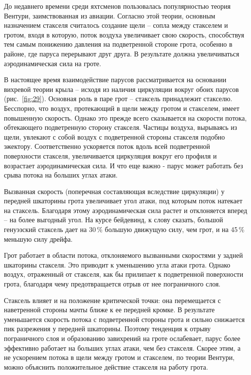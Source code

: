 \documentclass[a4paper, 12pt, twoside, final, book, russian, fittopage, cyremdash]{ncc}
\newcommand{\ris}[1]{\ref{fig:#1}}
\begin{document}
До недавнего времени среди яхтсменов пользовалась популярностью теория Вентури, заимствованная из авиации. Согласно этой теории, основным назначением стакселя считалось создание щели \--- сопла между стакселем и гротом, входя в которую, поток воздуха увеличивает свою скорость, способствуя тем самым понижению давления на подветренной стороне грота, особенно в районе, где паруса перерывают друг друга. В результате должна увеличиваться аэродинамическая сила на гроте.

В настоящее время взаимодействие парусов рассматривается на основании вихревой теории крыла \--- исходя из наличия циркуляции вокруг обоих парусов (рис.~\ris{29}). Основная роль в паре грот \--- стаксель принадлежит стакселю. Бесспорно, что воздух, протекающий в щели между гротом и стакселем, имеет повышенную скорость. Однако это прежде всего сказывается на скорости потока, обтекающего подветренную сторону стакселя. Частицы воздуха, вырываясь из щели, увлекают с собой воздух с подветренной стороны стакселя подобно эжектору. Соответственно ускоряется поток вдоль всей подветренной поверхности стакселя, увеличивается циркуляция вокруг его профиля и возрастает аэродинамическая сила. И что еще важно - парус может работать без срыва потока на больших углах атаки.
 
Вызванная скорость (поперечная составляющая вследствие циркуляции) у передней шкаторины грота увеличивает угол атаки, под которым поток натекает на стаксель. Благодаря этому аэродинамическая сила растет и отклоняется вперед \--- на более выгодный угол. На курсе бейдевинд, к слову сказать, большой генуэзский стаксель дает на 30\,\% большую движущую силу, чем грот, и на 45\,\% меньшую силу дрейфа.
 
Грот работает в области потока, отклоняемого вызванными скоростями у задней шкаторины стакселя. Это приводит к уменьшению угла атаки грота. Однако воздух, отраженный от стакселя, как бы прилипает к подветренной поверхности грота, благодаря чему предотвращается отрыв от нее пограничного слоя.

Стаксель влияет и на положение критической точки: она перемещается с наветренной стороны мачты ближе к ее передней кромке. В результате уменьшается скорость потока с подветренной стороны грота и сильно снижается пик разрежения у передней шкаторины. Поэтому тенденция к отрыву пограничного слоя и образованию завихрений на гроте ослабевает, парус более эффективно работает на больших углах атаки, чем без стакселя. Скорее этим, а не ускорением потока в щели между гротом и стакселем, по теории Вентури, можно объяснить положительное действие стакселя на работу грота.
\end{document}
